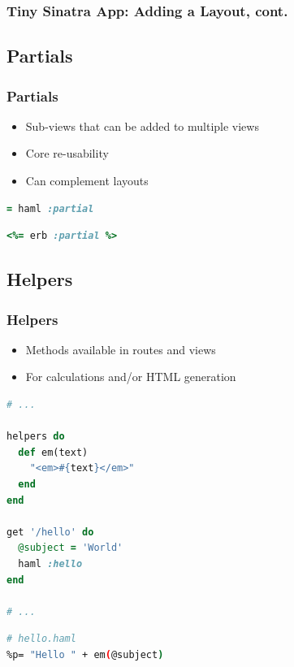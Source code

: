 \documentclass{beamer}
\begin{document}
\begin{frame}[fragile]\frametitle{Tiny Sinatra App: Adding a Layout, cont.}

  
  
\end{frame}




\subsection{Partials}
\begin{frame}[fragile]\frametitle{Partials}

  \begin{itemize}
    \item Sub-views that can be added to multiple views
    \item Core re-usability
    \item Can complement layouts
  \end{itemize}

  \begin{lstlisting}[language=ruby, escapechar={^}]
= haml :partial
  \end{lstlisting}

  \begin{lstlisting}[language=ruby, escapechar={^}]
<%= erb :partial %>
  \end{lstlisting}
  
\end{frame}





\subsection{Helpers}
\begin{frame}[fragile]\frametitle{Helpers}

  \begin{itemize}
    \item Methods available in routes and views
    \item For calculations and/or HTML generation
  \end{itemize}
  
  \begin{lstlisting}[language=ruby, escapechar={^}]
# ...

helpers do
  def em(text)
    "<em>#{text}</em>"
  end
end

get '/hello' do
  @subject = 'World'
  haml :hello
end

# ...
  \end{lstlisting}

  \begin{lstlisting}[language=bash, escapechar={^}]
# hello.haml
%p= "Hello " + em(@subject)
  \end{lstlisting}
  
\end{frame}
\end{document}
